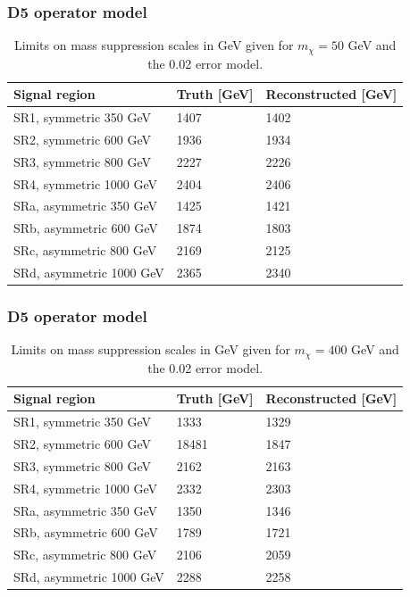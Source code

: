 \documentclass[handout]{beamer}
\begin{document}
\begin{frame}[shrink=10, noframenumbering]\frametitle{D5 operator model}
\begin{table}[ht]
\begin{center}
\begin{tabular}{|l|l|l|}
\hline
Signal region & Truth [GeV]& Reconstructed [GeV]\\ \hline
SR1, symmetric 350 GeV &1407&1402\\
SR2, symmetric 600 GeV&1936&1934\\
SR3, symmetric 800 GeV&2227&2226\\
SR4, symmetric 1000 GeV&2404&2406\\ \hline
SRa, asymmetric 350 GeV &1425&1421\\
SRb, asymmetric 600 GeV &1874&1803\\
SRc, asymmetric 800 GeV&2169&2125\\
SRd, asymmetric 1000 GeV&2365&2340\\ \hline
\end{tabular}
\caption{Limits on mass suppression scales in GeV given for $m_{\chi}=50$ GeV and the 0.02 error model.}
\label{tab:masssupp002}
\end{center}
\end{table}
\end{frame}
\begin{frame}[shrink=10, noframenumbering]\frametitle{D5 operator model}
\begin{table}[ht!]
\begin{center}
\begin{tabular}{|l|l|l|}
\hline
Signal region & Truth [GeV]& Reconstructed [GeV]\\ \hline
SR1, symmetric 350 GeV &1333&1329\\
SR2, symmetric 600 GeV&18481&1847\\
SR3, symmetric 800 GeV&2162&2163\\
SR4, symmetric 1000 GeV&2332&2303\\ \hline
SRa, asymmetric 350 GeV&1350&1346\\
SRb, asymmetric 600 GeV&1789&1721\\
SRc, asymmetric 800 GeV&2106&2059\\
SRd, asymmetric 1000 GeV&2288&2258\\ \hline
\end{tabular}
\caption{Limits on mass suppression scales in GeV given for $m_{\chi}=400$ GeV and the 0.02 error model.}
\label{tab:masssupp2002}
\end{center}
\end{table}
\end{frame}
\end{document}
